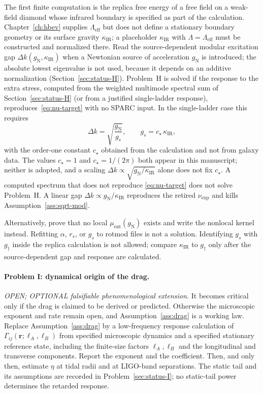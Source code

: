 The first finite computation is the replica free energy of a
free field on a weak-field diamond whose infrared boundary is
specified as part of the calculation. Chapter~\ref{ch:hbev} supplies
\(\Lambda_{\mathrm{eff}}\) but does not define a stationary boundary
geometry or its surface gravity \(\kappa_{\mathrm{IR}}\); a
placeholder \(\kappa_{\mathrm{IR}}\) with \(\Lambda=\Lambda_{\mathrm{eff}}\)
must be constructed and normalized there. Read the source-dependent
modular excitation gap \(\Delta k(g_{\mathrm{N}},\kappa_{\mathrm{IR}})\)
when a Newtonian source of acceleration \(g_{\mathrm{N}}\) is introduced;
the absolute lowest eigenvalue is not used, because it depends on an
additive normalization (Section~\ref{sec:status-H}). Problem~H is solved
if the response to the extra stress, computed from the weighted
multimode spectral sum of Section~\ref{sec:status-H} (or from a
justified single-ladder response), reproduces~\eqref{eq:nu-target}
with no SPARC input. In the single-ladder case this requires
\begin{equation}
  \label{eq:gap-H}
  \Delta k
  =
  \sqrt{\frac{g_{\mathrm{N}}}{g_s}},
  \qquad
  g_s=c_\star\,\kappa_{\mathrm{IR}},
\end{equation}
with the order-one constant \(c_\star\) obtained from the calculation
and not from galaxy data. The values \(c_\star=1\) and
\(c_\star=1/(2\pi)\) both appear in this manuscript; neither is
adopted, and a scaling
\(\Delta k\propto\sqrt{g_{\mathrm{N}}/\kappa_{\mathrm{IR}}}\) alone does
not fix \(c_\star\). A computed spectrum that does not reproduce
\eqref{eq:nu-target} does not solve Problem~H. A linear gap
\(\Delta k\propto g_{\mathrm{N}}/\kappa_{\mathrm{IR}}\)
reproduces the retired \(\nu_{\mathrm{exp}}\) and kills
Assumption~\ref{ass:sqrt-mod}.

Alternatively, prove that no local
\(\mu_{\mathrm{ent}}(g_{\mathrm{N}})\) exists and write the
nonlocal kernel instead. Refitting \(\alpha\), \(r_s\), or
\(g_s\) to rotmod files is not a solution. Identifying
\(g_s\) with \(g_\dagger\) inside the replica calculation is
not allowed; compare \(\kappa_{\mathrm{IR}}\) to \(g_\dagger\)
only after the source-dependent gap and response are calculated.

\paragraph{Problem I: dynamical origin of the drag.}
\emph{OPEN; OPTIONAL falsifiable phenomenological extension.}
It becomes critical only if the drag is claimed to be derived or
predicted. Otherwise the microscopic exponent and rate remain open,
and Assumption~\ref{ass:drag} is a working law.
Replace Assumption~\ref{ass:drag} by a low-frequency response
calculation of \(\Gamma_{ij}(\mathbf r;\ell_A,\ell_B)\) from
specified microscopic dynamics and a specified stationary reference
state, including the finite-size factors \(\ell_A,\ell_B\) and the
longitudinal and transverse components. Report the exponent and the
coefficient. Then, and only then, estimate \(\eta\) at
tidal radii and at LIGO-band separations. The static tail and its
assumptions are recorded in Problem~\ref{sec:status-I}; no static-tail
power determines the retarded response.

